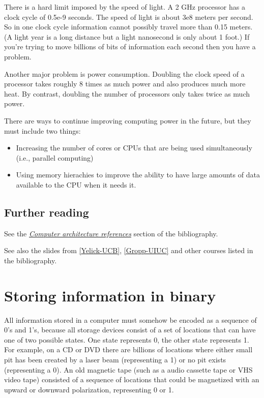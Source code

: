 \documentclass[letterpaper,10pt,english]{sphinxmanual}
\begin{document}
There is a hard limit imposed by the speed of light.  A 2 GHz
processor has a clock cycle of 0.5e-9 seconds.  The speed of light is
about 3e8 meters per second. So in one clock cycle information cannot
possibly travel more than 0.15 meters.  (A light year is a long distance but
a light nanosecond is only about 1 foot.)  If you're trying to move billions
of bits of information each second then you have a problem.

Another major problem is power consumption.  Doubling the clock speed of a
processor takes roughly 8 times as much power and also produces much more
heat.  By contrast, doubling the number of processors only takes twice as
much power.

There are ways to continue improving computing power in the future, but they
must include two things:
\begin{itemize}
\item {} 
Increasing the number of cores or CPUs that are being used simultaneously
(i.e., parallel computing)

\item {} 
Using memory hierachies to improve the ability to have large amounts of
data available to the CPU when it needs it.

\end{itemize}


\subsection{Further reading}
\label{computer_arch:further-reading}
See the {\hyperref[biblio:biblio-computer-arch]{\emph{Computer architecture references}}} section of the bibliography.

See also the slides from {\hyperref[biblio:yelick-ucb]{{[}Yelick-UCB{]}}}, {\hyperref[biblio:gropp-uiuc]{{[}Gropp-UIUC{]}}} and other courses
listed in the bibliography.


\section{Storing information in binary}
\label{memory:storing-information-in-binary}\label{memory::doc}\label{memory:memory}
All information stored in a computer must somehow be encoded as a sequence
of 0's and 1's, because all
storage devices consist of a set of locations that can have one of two possible
states.  One state represents 0, the other state represents 1.  For example,
on a CD or DVD there are billions of locations where either small pit has
been created by a laser beam (representing a 1) or no pit exists
(representing a 0).  An old magnetic tape (such as a audio cassette tape or
VHS video tape) consisted of a sequence of locations that could be
magnetized with an upward or downward polarization, representing 0 or 1.
\end{document}
